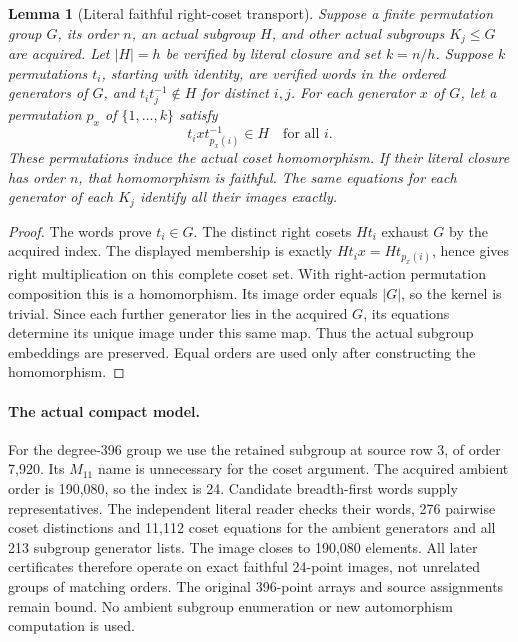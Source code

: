 \documentclass[11pt]{article}
\newtheorem{lemma}[theorem]{Lemma}
\begin{document}
\begin{lemma}[Literal faithful right-coset transport]
Suppose a finite permutation group $G$, its order $n$, an actual subgroup
$H$, and other actual subgroups $K_j\leq G$ are acquired. Let $|H|=h$
be verified by literal closure and set $k=n/h$. Suppose $k$ permutations
$t_i$, starting with identity, are verified words in the ordered generators
of $G$, and $t_i t_j^{-1}\notin H$ for distinct $i,j$. For each generator
$x$ of $G$, let a permutation $p_x$ of $\{1,\ldots,k\}$ satisfy
\[
             t_i x t_{p_x(i)}^{-1}\in H\quad\text{for all }i.
\]
These permutations induce the actual coset homomorphism. If their literal
closure has order $n$, that homomorphism is faithful. The same equations
for each generator of each $K_j$ identify all their images exactly.
\end{lemma}
\begin{proof}
The words prove $t_i\in G$. The distinct right cosets $Ht_i$ exhaust $G$
by the acquired index. The displayed membership is exactly
$Ht_i x=Ht_{p_x(i)}$, hence gives right multiplication on this complete
coset set. With right-action permutation composition this is a homomorphism.
Its image order equals $|G|$, so the kernel is trivial. Since each further
generator lies in the acquired $G$, its equations determine its unique image
under this same map. Thus the actual subgroup embeddings are preserved.
Equal orders are used only after constructing the homomorphism.
\end{proof}

\newpage
\paragraph{The actual compact model.}
For the degree-396 group we use the retained subgroup at source row 3,
of order 7,920. Its $M_{11}$ name is unnecessary for the coset argument.
The acquired ambient order is 190,080, so the index is 24. Candidate
breadth-first words supply representatives. The independent literal reader
checks their words, 276 pairwise coset distinctions and 11,112 coset
equations for the ambient generators and all 213 subgroup generator lists.
The image closes to 190,080 elements. All later certificates therefore
operate on exact faithful 24-point images, not unrelated groups of matching
orders. The original 396-point arrays and source assignments remain bound.
No ambient subgroup enumeration or new automorphism computation is used.
\end{document}
